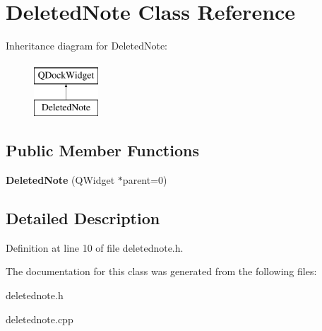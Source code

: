 \hypertarget{class_deleted_note}{}\section{Deleted\+Note Class Reference}
\label{class_deleted_note}
Inheritance diagram for Deleted\+Note\+:\begin{figure}[H]
\begin{center}
\leavevmode
\includegraphics[height=2.000000cm]{class_deleted_note}
\end{center}
\end{figure}
\subsection*{Public Member Functions}
\begin{DoxyCompactItemize}
\item 
\mbox{\label{class_deleted_note_a23fe178b1e3f593b9ac1957e44271e7e}} 
{\bfseries Deleted\+Note} (Q\+Widget $\ast$parent=0)
\end{DoxyCompactItemize}


\subsection{Detailed Description}


Definition at line 10 of file deletednote.\+h.



The documentation for this class was generated from the following files\+:\begin{DoxyCompactItemize}
\item 
deletednote.\+h\item 
deletednote.\+cpp\end{DoxyCompactItemize}
